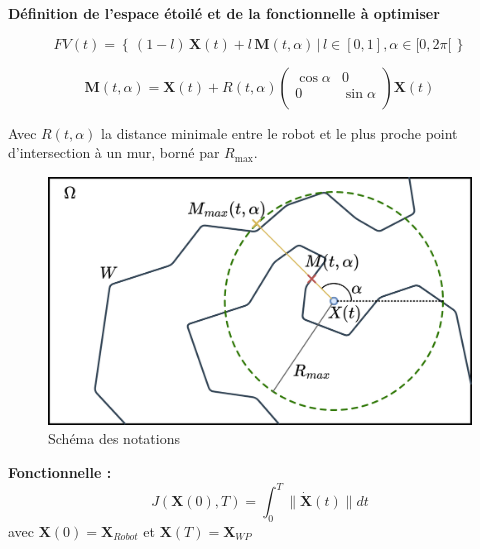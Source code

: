 \documentclass[aspectratio=169,10pt]{beamer}
\begin{document}
\begin{frame}[t]{\textbf{Définition de l'espace étoilé et de la fonctionnelle à optimiser}}
	\begin{minipage}[t]{0.6\linewidth}
		\begin{equation*}
			\displaystyle
			FV(t) = \left\{ \, (1 - l) \, \mathbf{X}(t) + l\, \mathbf{M}(t, \alpha) \,|\, l \in [0, 1], \alpha \in [0, 2 \pi[ \, \right\}
		\end{equation*}
			
		\begin{equation*}
			\mathbf{M}(t, \alpha) = \mathbf{X}(t) + R(t, \alpha) 
			\begin{pmatrix}
				\cos \alpha & 0\\
				0 & \sin \alpha\\
			\end{pmatrix} 
			\mathbf{X}(t)
		\end{equation*}

	Avec $R(t, \alpha)$ la distance minimale entre le robot et le plus proche point d'intersection à un mur, borné par $R_{\max}$.
	\end{minipage}
	\hfill
	\begin{minipage}[t]{0.38\linewidth}
		\begin{figure}
			\centering
			\includegraphics[width=\textwidth]{IMAGES/math_nota.png}
			\caption{Schéma des notations}
			\label{fig:math_notation}
		\end{figure}
	\end{minipage}

	\textbf{Fonctionnelle :}
	\begin{equation*}
		\displaystyle
		J(\mathbf{X}(0), T) = \int_{0}^{T} \| \mathbf{\dot{X}}(t) \| dt
	\end{equation*}
	avec $\mathbf{X}(0) = \mathbf{X}_{Robot}$ et $\mathbf{X}(T) = \mathbf{X}_{WP}$
	
\end{frame}
\end{document}
